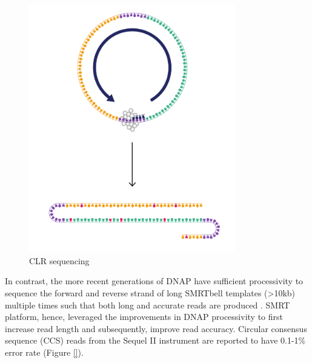 \begin{figure}[h!]
\caption{CLR sequencing}
\label{figure:clr-sequencing}
\begin{centering}
\includegraphics[width=0.8\textwidth]{Vector/CLR_sequencing.pdf}
\end{centering}
\end{figure}

In contrast, the more recent generations of DNAP have sufficient processivity to sequence the forward and reverse strand of long SMRTbell templates (>10kb) multiple times such that both long and accurate reads are produced \cite{Wenger2019-pw}. SMRT platform, hence, leveraged the improvements in DNAP processivity to first increase read length and subsequently, improve read accuracy. Circular consensus sequence (CCS) reads from the Sequel II instrument are reported to have 0.1-1\% error rate \cite{Wenger2019-pw} (Figure \ref{}).

